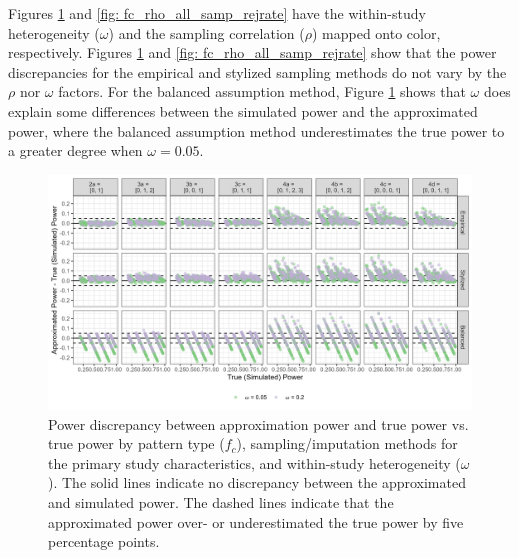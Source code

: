 Figures \ref{fig: fc_omega_all_samp_rejrate} and \ref{fig: fc_rho_all_samp_rejrate} have the within-study heterogeneity ($\omega$) and the sampling correlation ($\rho$) mapped onto color, respectively. Figures \ref{fig: fc_omega_all_samp_rejrate} and \ref{fig: fc_rho_all_samp_rejrate} show that the power discrepancies for the empirical and stylized sampling methods do not vary by the $\rho$ nor $\omega$ factors. For the balanced assumption method, Figure \ref{fig: fc_omega_all_samp_rejrate} shows that $\omega$ does explain some differences between the simulated power and the approximated power, where the balanced assumption method underestimates the true power to a greater degree when $\omega = 0.05$.  
 
\begin{figure}
    \centering
    \vspace{-5pt}\includegraphics[width=\linewidth]{chapters/plots/fc_omega_all_samp_rejrate.png}\caption{Power discrepancy between approximation power and true power vs. true power by pattern type ($f_c$), sampling/imputation methods for the primary study characteristics, and within-study heterogeneity ($\omega$). The solid lines indicate no discrepancy between the approximated and simulated power. The dashed lines indicate that the approximated power over- or underestimated the true power by five percentage points.\label{fig: fc_omega_all_samp_rejrate}}
    \vspace{-5pt}
\end{figure}

